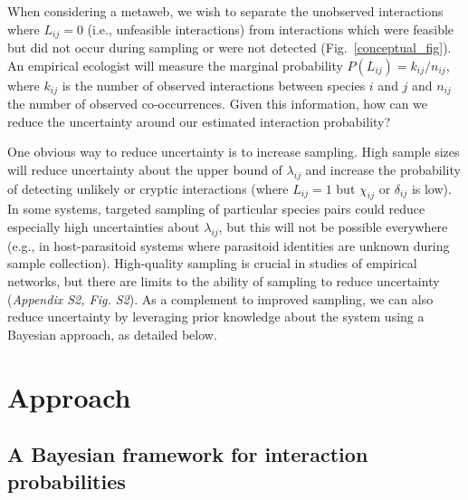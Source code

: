 \documentclass[12pt]{article}
\begin{document}
\begin{spacing}{2.0}
    When considering a metaweb, we wish to separate the unobserved interactions where $L_{ij}=0$ (i.e., unfeasible interactions) from interactions which were feasible but did not occur during sampling or  were not detected (Fig.~\ref{conceptual_fig}). An empirical ecologist will measure the marginal probability $P(L_{ij})=k_{ij}/n_{ij}$, where $k_{ij}$ is the number of observed interactions between species $i$ and $j$ and $n_{ij}$ the number of observed co-occurrences. Given this information, how can we reduce the uncertainty around our estimated interaction probability?


    One obvious way to reduce uncertainty is to increase sampling. High sample sizes will reduce uncertainty about the upper bound of $\lambda_{ij}$ and increase the probability of detecting unlikely or cryptic interactions (where $L_{ij}=1$ but $\chi_{ij}$ or $\delta_{ij}$ is low). In some systems, targeted sampling of particular species pairs could reduce especially high uncertainties about $\lambda_{ij}$, but this will not be possible everywhere (e.g., in host-parasitoid systems where parasitoid identities are unknown during sample collection). High-quality sampling is crucial in studies of empirical networks, but there are limits to the ability of sampling to reduce uncertainty (\emph{Appendix S2, Fig. S2}). As a complement to improved sampling, we can also reduce uncertainty by leveraging prior knowledge about the system using a Bayesian approach, as detailed below.


\section*{Approach}

  \subsection*{A Bayesian framework for interaction probabilities}







\end{spacing}
\end{document}
